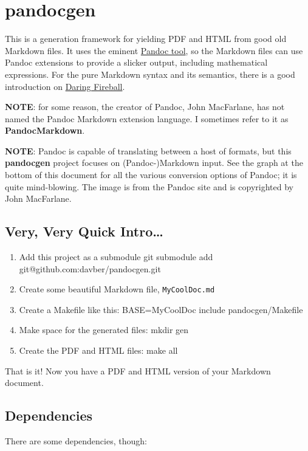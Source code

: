 \documentclass[oneside,]{memoir}
\begin{document}
\chapter{pandocgen}

This is a generation framework for yielding PDF and HTML from good old
Markdown files. It uses the eminent
\href{http://johnmacfarlane.net/pandoc/}{Pandoc tool}, so the Markdown
files can use Pandoc extensions to provide a slicker output, including
mathematical expressions. For the pure Markdown syntax and its
semantics, there is a good introduction on
\href{http://daringfireball.net/projects/markdown/syntax/}{Daring
Fireball}.

\textbf{NOTE}: for some reason, the creator of Pandoc, John MacFarlane,
has not named the Pandoc Markdown extension language. I sometimes refer
to it as \textbf{PandocMarkdown}.

\textbf{NOTE}: Pandoc is capable of translating between a host of
formats, but this \textbf{pandocgen} project focuses on
(Pandoc-)Markdown input. See the graph at the bottom of this document
for all the various conversion options of Pandoc; it is quite
mind-blowing. The image is from the Pandoc site and is copyrighted by
John MacFarlane.

\section{Very, Very Quick Intro\ldots{}}

\begin{enumerate}[1.]
\item
  Add this project as a submodule git submodule add
  git@github.com:davber/pandocgen.git
\item
  Create some beautiful Markdown file, \texttt{MyCoolDoc.md}
\item
  Create a Makefile like this: BASE=MyCoolDoc include pandocgen/Makefile
\item
  Make space for the generated files: mkdir gen
\item
  Create the PDF and HTML files: make all
\end{enumerate}
That is it! Now you have a PDF and HTML version of your Markdown
document.

\section{Dependencies}

There are some dependencies, though:
\end{document}
